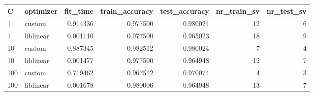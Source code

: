 \begin{tabular}{llrrrrr}
\toprule
  C & optimizer &  fit\_time &  train\_accuracy &  test\_accuracy &  nr\_train\_sv &  nr\_test\_sv \\
\midrule
  1 &    custom &  0.914336 &        0.977500 &       0.980024 &           12 &           6 \\
  1 & liblinear &  0.001110 &        0.977500 &       0.965023 &           18 &           9 \\
 10 &    custom &  0.887345 &        0.982512 &       0.980024 &            7 &           4 \\
 10 & liblinear &  0.001477 &        0.977500 &       0.964948 &           12 &           7 \\
100 &    custom &  0.719462 &        0.967512 &       0.970074 &            4 &           3 \\
100 & liblinear &  0.001678 &        0.980006 &       0.964948 &           13 &           7 \\
\bottomrule
\end{tabular}
